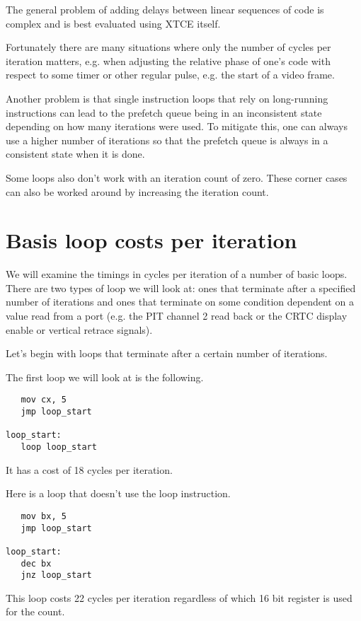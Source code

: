 \documentclass[a4paper,10pt]{amsart}
\begin{document}
The general problem of adding delays between linear sequences of code is
complex and is best evaluated using XTCE itself.

Fortunately there are many situations where only the number of cycles per
iteration matters, e.g. when adjusting the relative phase of one's code with
respect to some timer or other regular pulse, e.g. the start of a video frame.

Another problem is that single instruction loops that rely on long-running
instructions can lead to the prefetch queue being in an inconsistent state
depending on how many iterations were used. To mitigate this, one can always
use a higher number of iterations so that the prefetch queue is always in a
consistent state when it is done.

Some loops also don't work with an iteration count of zero. These corner
cases can also be worked around by increasing the iteration count.

\section{Basis loop costs per iteration}

We will examine the timings in cycles per iteration of a number of basic
loops. There are two types of loop we will look at: ones that terminate after
a specified number of iterations and ones that terminate on some condition
dependent on a value read from a port (e.g. the PIT channel 2 read back or
the CRTC display enable or vertical retrace signals).

Let's begin with loops that terminate after a certain number of iterations.

The first loop we will look at is the following.

\begin{lstlisting}
   mov cx, 5
   jmp loop_start

loop_start:
   loop loop_start
\end{lstlisting}

It has a cost of 18 cycles per iteration.

Here is a loop that doesn't use the loop instruction.

\begin{lstlisting}
   mov bx, 5
   jmp loop_start

loop_start:
   dec bx
   jnz loop_start
\end{lstlisting}

This loop costs 22 cycles per iteration regardless of which 16 bit register is
used for the count.
\end{document}
